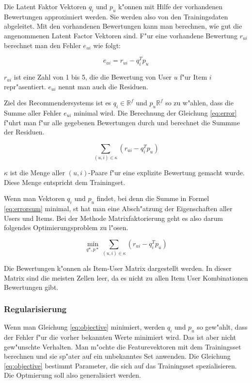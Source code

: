 \documentclass[a4paper, 12pt]{article}
\begin{document}
Die Latent Faktor Vektoren $q_i$ und $p_u$ k"onnen mit Hilfe der vorhandenen Bewertungen approximiert werden. Sie werden also von den Trainingsdaten abgeleitet. Mit den vorhandenen Bewertungen kann man berechnen, wie gut die angenommenen Latent Factor Vektoren sind. F"ur eine vorhandene Bewertung $r_{ui}$ berechnet man den Fehler $e_{ui}$ wie folgt:

\begin{equation}
  \label{eq:error}
  e_{ui} = r_{ui} - q_i^T p_u
\end{equation}

$r_{ui}$ ist eine Zahl von 1 bis 5, die die Bewertung von User $u$ f"ur Item $i$ repr"asentiert. $e_{ui}$ nennt man auch die Residuen.

Ziel des Recommendersystems ist es $q_i \in \mathbb{R}^f$ und $p_u \mathbb{R}^f$ so zu w"ahlen, dass die Summe aller Fehler $e_{ui}$ minimal wird. Die Berechnung der Gleichung \ref{eq:error} f"uhrt man f"ur alle gegebenen Bewertungen durch und berechnet die Summme der Residuen.

\begin{equation}
\label{eq:errorsum}
  \sum_{(u,i) \in \kappa} (r_{ui} - q_i^T p_u)
\end{equation}

$\kappa$ ist die Menge aller $(u,i)$-Paare f"ur eine explizite Bewertung gemacht wurde. Diese Menge entspricht dem Trainingset.

Wenn man Vektoren $q_i$ und $p_u$ findet, bei denn die Summe in Formel \ref{eq:errorsum} minimal, st hat man eine Absch"atzung der Eigenschaften aller Users und Items. Bei der Methode Matrixfaktorierung geht es also darum folgendes Optimierungsproblem zu l"osen.

\begin{equation}
  \label{eq:objective}
  \min_{q*,p*} \sum_{(u,i) \in \kappa} (r_{ui} - q_i^T p_u)
\end{equation}

 Die Bewertungen k"onnen als Item-User Matrix dargestellt werden. In dieser Matrix sind die meisten Zellen leer, da es nicht zu allen Item User Kombinationen Bewertungen gibt. 


\subsubsection{Regularisierung}
\label{sec:regularization}

Wenn man Gleichung \ref{eq:objective} minimiert, werden $q_i$ und $p_u$ so gew"ahlt, dass der Fehler f"ur die vorher bekannten Werte minimiert wird. Das ist aber nicht gew"unschte Verhalten. Man m"ochte die Featurevektoren mit dem Trainingsset berechnen und sie sp"ater auf ein unbekanntes Set anwenden. Die Gleichung \ref{eq:objective} bestimmt Parameter, die sich auf das Trainingsset spezialisieren. Die Optmierung soll also generalisiert werden.
\end{document}
